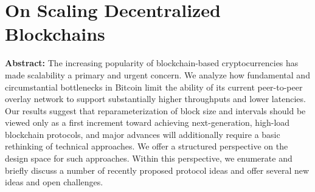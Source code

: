 \section{On Scaling Decentralized Blockchains}

\textbf{Abstract:} 
The increasing popularity of blockchain-based cryptocurrencies has made scalability a primary and urgent concern. We analyze how fundamental  and  circumstantial  bottlenecks  in  Bitcoin  limit  the  ability of its current peer-to-peer overlay network to support substantially higher throughputs and lower latencies. Our results suggest that reparameterization of block size and intervals should be viewed only as a first increment toward achieving next-generation, high-load blockchain protocols, and major advances will additionally require a basic rethinking of technical  approaches.  We  offer  a  structured  perspective  on  the  design space for such approaches. Within this perspective, we enumerate and briefly  discuss  a  number  of  recently  proposed  protocol  ideas  and  offer several new ideas and open challenges.
